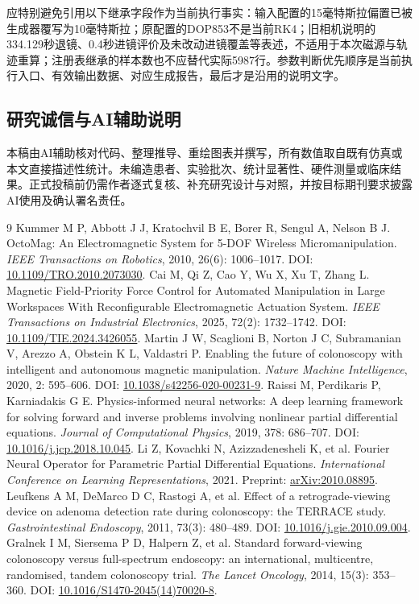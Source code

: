 \documentclass[UTF8,a4paper,zihao=5,fontset=windows]{ctexart}
\begin{document}
应特别避免引用以下继承字段作为当前执行事实：输入配置的15毫特斯拉偏置已被生成器覆写为10毫特斯拉；原配置的DOP853不是当前RK4；旧相机说明的334.129秒退镜、0.4秒进镜评价及未改动进镜覆盖等表述，不适用于本次磁源与轨迹重算；注册表继承的样本数也不应替代实际5987行。参数判断优先顺序是当前执行入口、有效输出数据、对应生成报告，最后才是沿用的说明文字。

\subsection*{研究诚信与AI辅助说明}
本稿由AI辅助核对代码、整理推导、重绘图表并撰写，所有数值取自既有仿真或本文直接描述性统计。未编造患者、实验批次、统计显著性、硬件测量或临床结果。正式投稿前仍需作者逐式复核、补充研究设计与对照，并按目标期刊要求披露AI使用及确认署名责任。

\clearpage
{}
\begin{thebibliography}{9}
Kummer M P, Abbott J J, Kratochvil B E, Borer R, Sengul A, Nelson B J.
OctoMag: An Electromagnetic System for 5-DOF Wireless Micromanipulation.
\textit{IEEE Transactions on Robotics}, 2010, 26(6): 1006--1017.
DOI: \href{https://doi.org/10.1109/TRO.2010.2073030}{10.1109/TRO.2010.2073030}.
Cai M, Qi Z, Cao Y, Wu X, Xu T, Zhang L.
Magnetic Field-Priority Force Control for Automated Manipulation in Large Workspaces With Reconfigurable Electromagnetic Actuation System.
\textit{IEEE Transactions on Industrial Electronics}, 2025, 72(2): 1732--1742.
DOI: \href{https://doi.org/10.1109/TIE.2024.3426055}{10.1109/TIE.2024.3426055}.
Martin J W, Scaglioni B, Norton J C, Subramanian V, Arezzo A, Obstein K L, Valdastri P.
Enabling the future of colonoscopy with intelligent and autonomous magnetic manipulation.
\textit{Nature Machine Intelligence}, 2020, 2: 595--606.
DOI: \href{https://doi.org/10.1038/s42256-020-00231-9}{10.1038/s42256-020-00231-9}.
Raissi M, Perdikaris P, Karniadakis G E.
Physics-informed neural networks: A deep learning framework for solving forward and inverse problems involving nonlinear partial differential equations.
\textit{Journal of Computational Physics}, 2019, 378: 686--707.
DOI: \href{https://doi.org/10.1016/j.jcp.2018.10.045}{10.1016/j.jcp.2018.10.045}.
Li Z, Kovachki N, Azizzadenesheli K, et al.
Fourier Neural Operator for Parametric Partial Differential Equations.
\textit{International Conference on Learning Representations}, 2021.
Preprint: \href{https://arxiv.org/abs/2010.08895}{arXiv:2010.08895}.
Leufkens A M, DeMarco D C, Rastogi A, et al.
Effect of a retrograde-viewing device on adenoma detection rate during colonoscopy: the TERRACE study.
\textit{Gastrointestinal Endoscopy}, 2011, 73(3): 480--489.
DOI: \href{https://doi.org/10.1016/j.gie.2010.09.004}{10.1016/j.gie.2010.09.004}.
Gralnek I M, Siersema P D, Halpern Z, et al.
Standard forward-viewing colonoscopy versus full-spectrum endoscopy: an international, multicentre, randomised, tandem colonoscopy trial.
\textit{The Lancet Oncology}, 2014, 15(3): 353--360.
DOI: \href{https://doi.org/10.1016/S1470-2045(14)70020-8}{10.1016/S1470-2045(14)70020-8}.
\end{thebibliography}
\end{document}
